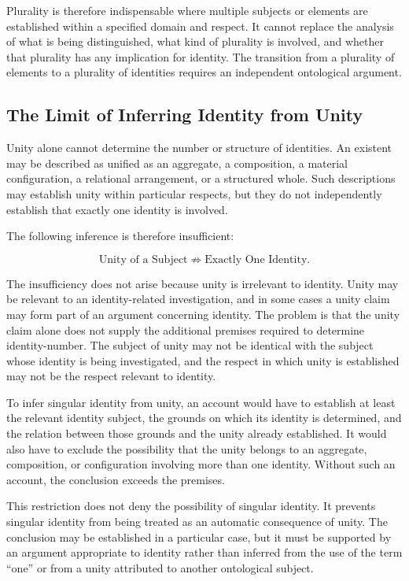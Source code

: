 Plurality is therefore indispensable where multiple
subjects or elements are established within a specified
domain and respect. It cannot replace the analysis
of what is being distinguished, what kind of plurality
is involved, and whether that plurality has any
implication for identity. The transition from a
plurality of elements to a plurality of identities
requires an independent ontological argument.

\subsection{The Limit of Inferring Identity from Unity}

Unity alone cannot determine the number or structure
of identities. An existent may be described as unified
as an aggregate, a composition, a material configuration,
a relational arrangement, or a structured whole. Such
descriptions may establish unity within particular
respects, but they do not independently establish
that exactly one identity is involved.

The following inference is therefore insufficient:

\[
\text{Unity of a Subject}
\not\Rightarrow
\text{Exactly One Identity}.
\]

The insufficiency does not arise because unity is
irrelevant to identity. Unity may be relevant to an
identity-related investigation, and in some cases
a unity claim may form part of an argument concerning
identity. The problem is that the unity claim alone
does not supply the additional premises required to
determine identity-number. The subject of unity may
not be identical with the subject whose identity
is being investigated, and the respect in which
unity is established may not be the respect relevant
to identity.

To infer singular identity from unity, an account
would have to establish at least the relevant identity
subject, the grounds on which its identity is determined,
and the relation between those grounds and the unity
already established. It would also have to exclude
the possibility that the unity belongs to an aggregate,
composition, or configuration involving more than
one identity. Without such an account, the conclusion
exceeds the premises.

This restriction does not deny the possibility of
singular identity. It prevents singular identity
from being treated as an automatic consequence of
unity. The conclusion may be established in a
particular case, but it must be supported by an
argument appropriate to identity rather than inferred
from the use of the term ``one'' or from a unity
attributed to another ontological subject.

